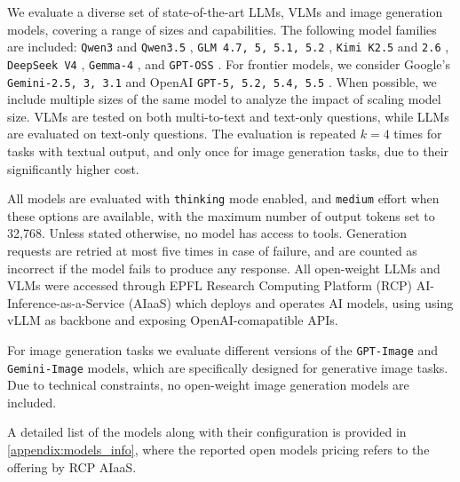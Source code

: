 We evaluate a diverse set of state-of-the-art LLMs, VLMs and image generation models, covering a range of sizes and capabilities. The following model families are included: \texttt{Qwen3} and \texttt{Qwen3.5} \citep{qwen2025qwen3, qwen2026qwen35omni}, \texttt{GLM 4.7, 5, 5.1, 5.2} \citep{zeng2026glm5}, \texttt{Kimi K2.5} and \texttt{2.6} \citep{kimi2026k25}, \texttt{DeepSeek V4} \citep{deepseek2026v4}, \texttt{Gemma-4} \cite{google2026gemma4}, and \texttt{GPT-OSS} \citep{agarwal2025gptoss}. For frontier models, we consider Google's \texttt{Gemini-2.5, 3, 3.1} \citep{comanici2025gemini25, google2025gemini3, google2026gemini31} and OpenAI \texttt{GPT-5, 5.2, 5.4, 5.5} \citep{openai2025gpt5, openai2026gpt54, openai2026gpt55}. When possible, we include multiple sizes of the same model to analyze the impact of scaling model size. VLMs are tested on both multi-to-text and text-only questions, while LLMs are evaluated on text-only questions. The evaluation is repeated $k=4$ times for tasks with textual output, and only once for image generation tasks, due to their significantly higher cost.

All models are evaluated with \texttt{thinking} mode enabled, and \texttt{medium} effort when these options are available, with the maximum number of output tokens set to 32{,}768. Unless stated otherwise, no model has access to tools. Generation requests are retried at most five times in case of failure, and are counted as incorrect if the model fails to produce any response. All open-weight LLMs and VLMs were accessed through EPFL Research Computing Platform (RCP) AI-Inference-as-a-Service (AIaaS) which deploys and operates AI models, using using vLLM \citep{kwon2023efficient} as backbone and exposing OpenAI-comapatible APIs.

For image generation tasks we evaluate different versions of the \texttt{GPT-Image} and \texttt{Gemini-Image} models, which are specifically designed for generative image tasks. Due to technical constraints, no open-weight image generation models are included.

A detailed list of the models along with their configuration is provided in \autoref{appendix:models_info}, where the reported open models pricing refers to the offering by RCP AIaaS.